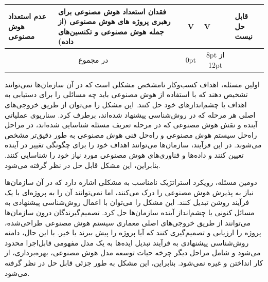 \documentclass[a4paper,10pt]{article}
\begin{document}
\begin{table}
\begin{tabularx}{\textwidth}{ p{1.5cm} p{6.5cm} c c c c p{5.5cm} }
                            عدم استعداد هوش مصنوعی & فقدان استعداد هوش مصنوعی برای رهبری پروژه های هوش مصنوعی (از جمله هوش مصنوعی و تکنسین‌های داده) & V & V &  &  & قابل حل نیست \\

                            \hline

                            \multicolumn{2}{c}{در مجموع} & 0pt & \multicolumn{3}{c}{8pt از 12pt} \\

                            \hline

                        \end{tabularx}

                    \end{table}

                    اولین مسئله، اهداف کسب‌وکار نامشخص مشکلی است که در آن سازمان‌ها نمی‌توانند تشخیص دهند که با استفاده از هوش مصنوعی باید چه مسائلی را برای دستیابی به اهداف یا چشم‌اندازهای خود حل کنند. این مشکل را می‌توان از طریق خروجی‌های اصلی هر مرحله که در روش‌شناسی پیشنهاد شده‌اند، برطرف کرد. سناریوی عملیاتی آینده و نقش هوش مصنوعی که در مرحله تعریف مسئله شناسایی شده‌اند، در مراحل راه‌حل سیستم هوش مصنوعی و راه‌حل فنی هوش مصنوعی به طور دقیق‌تر مشخص می‌شوند. در این فرآیند، سازمان‌ها می‌توانند اهداف خود را برای چگونگی تغییر در آینده تعیین کنند و داده‌ها و فناوری‌های هوش مصنوعی مورد نیاز خود را شناسایی کنند. بنابراین، این مشکل قابل حل در نظر گرفته می‌شود.

                    دومین مسئله، رویکرد استراتژیک نامناسب به مشکلی اشاره دارد که در آن سازمان‌ها نیاز به پذیرش هوش مصنوعی را درک می‌کنند، اما نمی‌توانند آن را به پروژه‌ای با یک فرآیند روشن تبدیل کنند. این مشکل را می‌توان با اعمال روش‌شناسی پیشنهادی به مسائل کنونی یا چشم‌انداز آینده سازمان‌ها حل کرد. تصمیم‌گیرندگان درون سازمان‌ها می‌توانند از طریق خروجی‌های اصلی معماری سیستم هوش مصنوعی طراحی‌شده، پروژه را ارزیابی و تصمیم‌گیری کنند که آیا پروژه را پیش ببرند یا خیر. با این حال، دامنه روش‌شناسی پیشنهادی به فرآیند تبدیل ایده‌ها به یک مدل مفهومی قابل‌اجرا محدود می‌شود و شامل مراحل دیگر چرخه حیات توسعه مدل هوش مصنوعی، بهره‌برداری، از کار انداختن و غیره نمی‌شود. بنابراین، این مشکل به طور جزئی قابل حل در نظر گرفته می‌شود.
\end{document}
